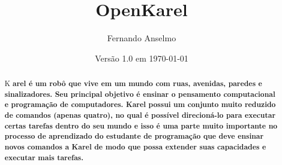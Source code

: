\documentclass[a4paper,11pt]{article}
\title{OpenKarel}
\author{Fernando Anselmo}
\date{Versão 1.0 em \today} %
\newcommand{\initial}[1]{ %
  \lettrine[lines=3,lhang=0.3,nindent=0em]{
    \color{DarkGoldenrod}
    {\textsf{#1}}
  }{}
}
\begin{document}
\maketitle %
\thispagestyle{fancy} %


\begin{abstract}
\initial{K}\textbf{arel é um robô que vive em um mundo com ruas, avenidas, paredes e sinalizadores. Seu principal objetivo é ensinar o pensamento computacional e programação de computadores. Karel possui um conjunto muito reduzido de comandos (apenas quatro), no qual é possível direcioná-lo para executar certas tarefas dentro do seu mundo e isso é uma parte muito importante no processo de aprendizado do estudante de programação que deve ensinar novos comandos a Karel de modo que possa extender suas capacidades e executar mais tarefas.}
\end{abstract}
\vspace{20pt}

\end{document}
